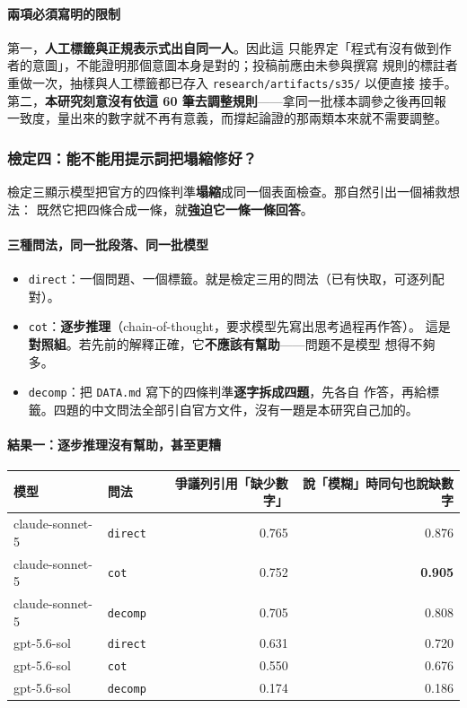 \documentclass[11pt,a4paper]{ctexart}
\newcommand{\fn}[1]{\texttt{#1}}
\begin{document}
\paragraph{兩項必須寫明的限制} 第一，\textbf{人工標籤與正規表示式出自同一人}。因此這
只能界定「程式有沒有做到作者的意圖」，不能證明那個意圖本身是對的；投稿前應由未參與撰寫
規則的標註者重做一次，抽樣與人工標籤都已存入 \texttt{research/artifacts/s35/} 以便直接
接手。第二，\textbf{本研究刻意沒有依這 60 筆去調整規則}——拿同一批樣本調參之後再回報
一致度，量出來的數字就不再有意義，而撐起論證的那兩類本來就不需要調整。

\subsubsection{檢定四：能不能用提示詞把塌縮修好？}
\label{sec:decomp}

檢定三顯示模型把官方的四條判準\textbf{塌縮}成同一個表面檢查。那自然引出一個補救想法：
既然它把四條合成一條，就\textbf{強迫它一條一條回答}。

\paragraph{三種問法，同一批段落、同一批模型}

\begin{itemize}[leftmargin=2em, itemsep=3pt]
  \item \fn{direct}：一個問題、一個標籤。就是檢定三用的問法（已有快取，可逐列配對）。
  \item \fn{cot}：\textbf{逐步推理}（chain-of-thought，要求模型先寫出思考過程再作答）。
        這是\textbf{對照組}。若先前的解釋正確，它\textbf{不應該有幫助}——問題不是模型
        想得不夠多。
  \item \fn{decomp}：把 \texttt{DATA.md} 寫下的四條判準\textbf{逐字拆成四題}，先各自
        作答，再給標籤。四題的中文問法全部引自官方文件，沒有一題是本研究自己加的。
\end{itemize}

\paragraph{結果一：逐步推理沒有幫助，甚至更糟}

\begin{table}[h]
\centering\small
\begin{tabular}{@{}llrr@{}}
\toprule
模型 & 問法 & 爭議列引用「缺少數字」 & 說「模糊」時同句也說缺數字 \\
\midrule
claude-sonnet-5 & \fn{direct} & 0.765 & 0.876 \\
claude-sonnet-5 & \fn{cot} & 0.752 & \textbf{0.905} \\
\rowcolor{yellow!12}
claude-sonnet-5 & \fn{decomp} & 0.705 & 0.808 \\
\midrule
gpt-5.6-sol & \fn{direct} & 0.631 & 0.720 \\
gpt-5.6-sol & \fn{cot} & 0.550 & 0.676 \\
\rowcolor{gray!15}
gpt-5.6-sol & \fn{decomp} & 0.174 & 0.186 \\
\bottomrule
\end{tabular}
\end{table}
\end{document}
